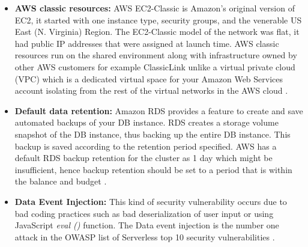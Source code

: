 \begin{itemize}
    \item \textbf{AWS classic resources:} AWS EC2-Classic is Amazon's original version of EC2,
    it started with one instance type, security groups, and the venerable US East (N. Virginia) Region.
    The EC2-Classic model of the network was flat, it had public IP addresses that were assigned at launch time.
    AWS classic resources run on the shared environment along with infrastructure owned by other AWS customers for
    example ClassicLink unlike a virtual private cloud (VPC) which is a dedicated virtual space for your Amazon Web Services account isolating from the rest of the virtual networks in the AWS cloud \cite{60}.
\end{itemize}

\begin{itemize}
    \item \textbf{Default data retention:} Amazon RDS provides a feature to create and save automated backups of your DB
    instance.
    RDS creates a storage volume snapshot of the DB instance, thus backing up the entire DB instance.
    This
    backup is saved according to the retention period specified.
    AWS has a default RDS backup retention for the
    cluster as 1 day which might be insufficient, hence backup retention should be set to a period that
    is within the balance and budget \cite{35} \cite{39}.
\end{itemize}

\begin{itemize}
    \item \textbf{Data Event Injection:} This kind of security vulnerability occurs due to bad coding practices such
    as bad
    deserialization of user input or using JavaScript \textit{eval ()} function.
    The Data event injection is the
    number
    one
    attack in the OWASP list of Serverless top 10 security vulnerabilities \cite{59}.
\end{itemize}

